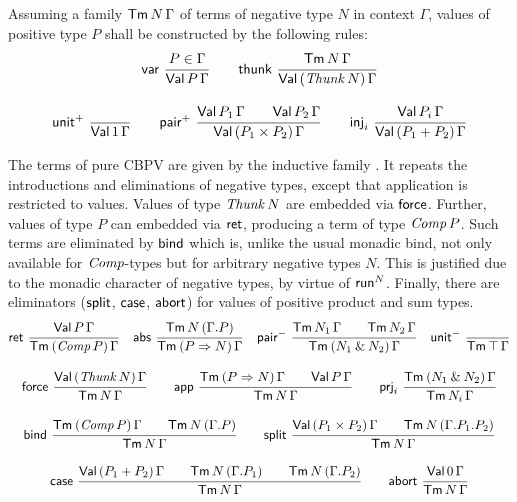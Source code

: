 \documentclass[a4paper,USenglish,cleveref, autoref]{lipics-v2019}
\begin{document}
Assuming a family $\mathsf{Tm}^{\,}N\,\Gamma$ of terms of negative type $N$ in
context $\Gamma$, values 
of positive type $P$ shall be constructed by the
following rules:
\begin{gather*}
  \nru{\tvar}{P \in \Gamma}{\PValT P \Gamma}
\qquad
  \nru{\tthunk}{\Tm N \Gamma}{\PValTP{\Thunk N}\Gamma}
\\[2ex]
  \nru{\punit}{}{\PValT{\tyone}\Gamma}
\qquad
  \nru{\ppair}
      {\PValT{P_1}\Gamma \qquad \PValT{P_2}\Gamma}
      {\PValTP{P_1 \times P_2}\Gamma}
\qquad
  \nru{\tinj_i}{\PValT{P_i}\Gamma}{\PValTP{P_1 + P_2}\Gamma}
\end{gather*}

The terms of pure CBPV are given by the inductive family .
It repeats the introductions and eliminations of negative types,
except that application is restricted to values.  Values of type
$\mathit{Thunk}\,N$ are embedded via $\mathsf{force}$.
Further, values of type $P$ can embedded
via $\mathsf{ret}$, producing a term of type $\mathit{Comp}\,P$.  Such terms are
eliminated by $\mathsf{bind}$ which is, unlike the usual monadic bind, not
only available for $\mathit{Comp}$-types but for arbitrary negative types
$N$.  This is justified due to the monadic character of negative
types, by virtue of $\mathsf{run}^N$.  Finally, there are eliminators
($\mathsf{split}$, $\mathsf{case}$, $\mathsf{abort}$) for values of positive product and
sum types.
\begin{gather*}
  \nru{\tret}
      {\PValTm P \Gamma}
      {\TmP {\Comp P} \Gamma}
\quad
  \nru{\tabs}
      {\Tm N {(\cext \Gamma P)}}
      {\TmP {P \To N} \Gamma}
\quad
  \nru{\npair}
      {\Tm {N_1} \Gamma \qquad \Tm {N_2} \Gamma}
      {\TmP {N_1 \ntimes N_2} \Gamma}
\quad
  \nru{\nunit}
      {}
      {\Tm \top \Gamma}
\\[2ex]
  \nru{\tforce}
      {\PValTmP {\Thunk N} \Gamma}
      {\Tm N \Gamma}
\qquad
  \nru{\tapp}
      {\TmP {P \To N} \Gamma \qquad \PValTm P \Gamma}
      {\Tm N \Gamma}
\qquad
  \nru{\tprj_i}
      {\TmP {N_1 \ntimes N_2} \Gamma}
      {\Tm {N_i} \Gamma}
\\[2ex]
  \nru{\tbind}
      {\TmP {\Comp P} \Gamma \qquad \Tm N {(\cext \Gamma P)}}
      {\Tm N \Gamma}
\qquad
  \nru{\tsplit}
    {\PValTmP {P_1 \times P_2} \Gamma
      \qquad \Tm N {(\cext {\cext \Gamma P_1} P_2)}
    }{\Tm N \Gamma}
\\[2ex]
  \nru{\tcase}
    {\PValTmP {P_1 + P_2} \Gamma
      \qquad \Tm N {(\cext \Gamma P_1)}
      \qquad \Tm N {(\cext \Gamma P_2)}
    }{\Tm N \Gamma}
\qquad
  \nru{\tabort}
    {\PValTm \tyzero \Gamma}
    {\Tm N \Gamma}
\end{gather*}
\end{document}
